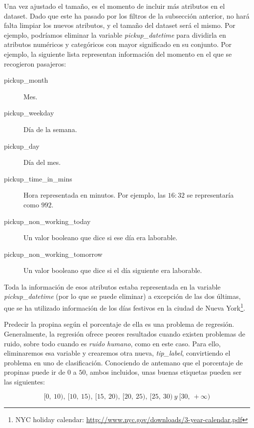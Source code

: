 Una vez ajustado el tamaño, es el momento de incluir más atributos en el dataset. Dado que este ha pasado por los filtros de la subsección anterior, no hará falta limpiar los nuevos atributos, y el tamaño del dataset será el mismo. Por ejemplo, podríamos eliminar la variable \emph{pickup\_datetime} para dividirla en atributos numéricos y categóricos con mayor significado en su conjunto. Por ejemplo, la siguiente lista representan información del momento en el que se recogieron pasajeros:

\begin{description}
\item[pickup\_month] Mes.

\item[pickup\_weekday] Día de la semana.

\item[pickup\_day] Día del mes.

\item[pickup\_time\_in\_mins] Hora representada en minutos. Por ejemplo, las $16:32$ se representaría como $992$.

\item[pickup\_non\_working\_today] Un valor booleano que dice si ese día era laborable.

\item[pickup\_non\_working\_tomorrow] Un valor booleano que dice si el día siguiente era laborable.
\end{description}

Toda la información de esos atributos estaba representada en la variable \emph{pickup\_datetime} (por lo que se puede eliminar) a excepción de las dos últimas, que se ha utilizado información de los días festivos en la ciudad de Nueva York\footnote{NYC holiday calendar: \href{http://www.nyc.gov/html/opa/downloads/pdf/3-year\%20Calendar\%202013-2014-2015.pdf}{http://www.nyc.gov/downloads/3-year-calendar.pdf}}.

Predecir la propina según el porcentaje de ella es una problema de regresión. Generalmente, la regresión ofrece peores resultados cuando existen problemas de ruido, sobre todo cuando es \emph{ruido humano}, como en este caso. Para ello, eliminaremos esa variable y crearemos otra nueva, \emph{tip\_label}, convirtiendo el problema en uno de clasificación. Conociendo de antemano que el porcentaje de propinas puede ir de $0$ a $50$, ambos incluidos, unas buenas etiquetas pueden ser las siguientes:

$$
[0,\:10),\:[10,\:15),\:[15,\:20),\:[20,\:25),\:[25,\:30)\:y\:[30,\:+\infty)
$$

